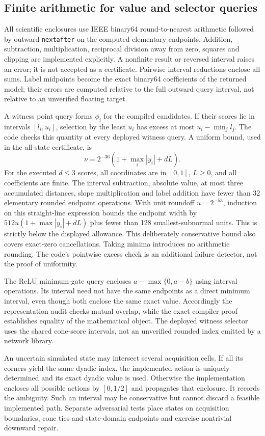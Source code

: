 \subsection{Finite arithmetic for value and selector queries}
All scientific enclosures use IEEE binary64 round-to-nearest arithmetic followed by outward \texttt{nextafter} on the computed elementary endpoints. Addition, subtraction, multiplication, reciprocal division away from zero, squares and clipping are implemented explicitly. A nonfinite result or reversed interval raises an error; it is not accepted as a certificate. Pairwise interval reductions enclose all sums. Label midpoints become the exact binary64 coefficients of the returned model; their errors are computed relative to the full outward query interval, not relative to an unverified floating target.

A witness point query forms $\phi_i$ for the compiled candidates. If their scores lie in intervals $[l_i,u_i]$, selection by the least $u_i$ has excess at most $u_i-\min_jl_j$. The code checks this quantity at every deployed witness query. A uniform bound, used in the all-state certificate, is
\[
 \nu=2^{-36}\left(1+\max_i|y_i|+dL\right).
\]
For the executed $d\le3$ scores, all coordinates are in $[0,1]$, $L\ge0$, and all coefficients are finite. The interval subtraction, absolute value, at most three accumulated distances, slope multiplication and label addition have fewer than 32 elementary rounded endpoint operations. With unit roundoff $u=2^{-53}$, induction on this straight-line expression bounds the endpoint width by $512u(1+\max|y_i|+dL)$ plus fewer than 128 smallest-subnormal units. This is strictly below the displayed allowance. This deliberately conservative bound also covers exact-zero cancellations. Taking minima introduces no arithmetic rounding. The code's pointwise excess check is an additional failure detector, not the proof of uniformity.

The ReLU minimum-gate query encloses $a-\max\{0,a-b\}$ using interval operations. Its interval need not have the same endpoints as a direct minimum interval, even though both enclose the same exact value. Accordingly the representation audit checks mutual overlap, while the exact compiler proof establishes equality of the mathematical object. The deployed witness selector uses the shared cone-score intervals, not an unverified rounded index emitted by a network library.

An uncertain simulated state may intersect several acquisition cells. If all its corners yield the same dyadic index, the implemented action is uniquely determined and its exact dyadic value is used. Otherwise the implementation encloses all possible actions by $[0,1/2]$ and propagates that enclosure. It records the ambiguity. Such an interval may be conservative but cannot discard a feasible implemented path. Separate adversarial tests place states on acquisition boundaries, cone ties and state-domain endpoints and exercise nontrivial downward repair.

